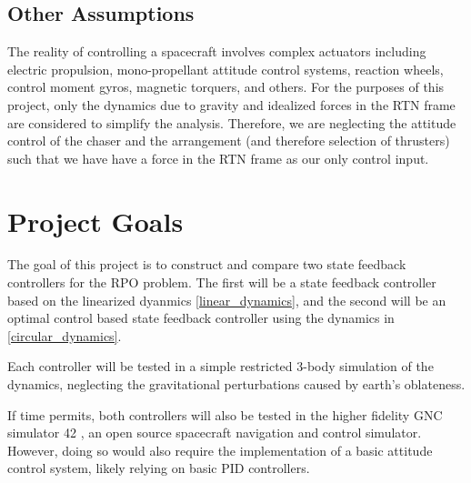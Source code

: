 \documentclass[12pt, letterpaper,titlepage]{article}
\begin{document}
\subsection{Other Assumptions}

The reality of controlling a spacecraft involves complex actuators including
electric propulsion, mono-propellant attitude control systems, reaction wheels,
control moment gyros, magnetic torquers, and others. For the purposes of this
project, only the dynamics due to gravity and idealized forces in the RTN frame
are considered to simplify the analysis. Therefore, we are neglecting the
attitude control of the chaser and the arrangement (and therefore selection of
thrusters) such that we have have a force in the RTN frame as our only control
input.

\section{Project Goals}

The goal of this project is to construct and compare two state feedback
controllers for the RPO problem. The first will be a state feedback controller
based on the linearized dyanmics \ref{linear_dynamics}, and the second will be
an optimal control based state feedback controller using the dynamics in
\ref{circular_dynamics}.

Each controller will be tested in a simple restricted 3-body simulation of the
dynamics, neglecting the gravitational perturbations caused by earth's
oblateness.

If time permits, both controllers will also be tested in the higher fidelity
GNC simulator 42 \cite{42}, an open source spacecraft navigation and control
simulator. However, doing so would also require the implementation of a basic
attitude control system, likely relying on basic PID controllers.



\end{document}
